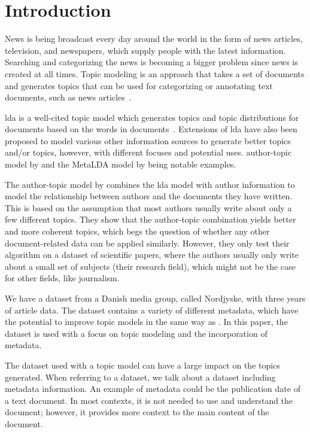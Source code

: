 \section{Introduction}\label{sec:introduction}
News is being broadcast every day around the world in the form of news articles, television, and newspapers, which supply people with the latest information.
Searching and categorizing the news is becoming a bigger problem since news is created at all times.
Topic modeling is an approach that takes a set of documents and generates topics that can be used for categorizing or annotating text documents, such as news articles~\cite{Probabilistic_Topic_Models}.

\Gls{lda} is a well-cited topic model which generates topics and topic distributions for documents based on the words in documents~\cite{blei2003latent}.
Extensions of \gls{lda} have also been proposed to model various other information sources to generate better topics and/or topics, however, with different focuses and potential uses.
author-topic model by \citet{author_topic_2012} and the MetaLDA model by \citet{MetaLDA2017} being notable examples.

The author-topic model by \citet{author_topic_2012} combines the \gls{lda} model with author information to model the relationship between authors and the documents they have written.
This is based on the assumption that most authors usually write about only a few different topics.
They show that the author-topic combination yields better and more coherent topics, which begs the question of whether any other document-related data can be applied similarly.
However, they only test their algorithm on a dataset of scientific papers, where the authors usually only write about a small set of subjects (their research field), which might not be the case for other fields, like journalism.

We have a dataset from a Danish media group, called Nordjyske, with three years of article data.
The dataset contains a variety of different metadata, which have the potential to improve topic models in the same way as \citet{author_topic_2012}. 
In this paper, the dataset is used with a focus on topic modeling and the incorporation of metadata.

The dataset used with a topic model can have a large impact on the topics generated.
When referring to a dataset, we talk about a dataset including metadata information.
An example of metadata could be the publication date of a text document. 
In most contexts, it is not needed to use and understand the document; however, it provides more context to the main content of the document.

